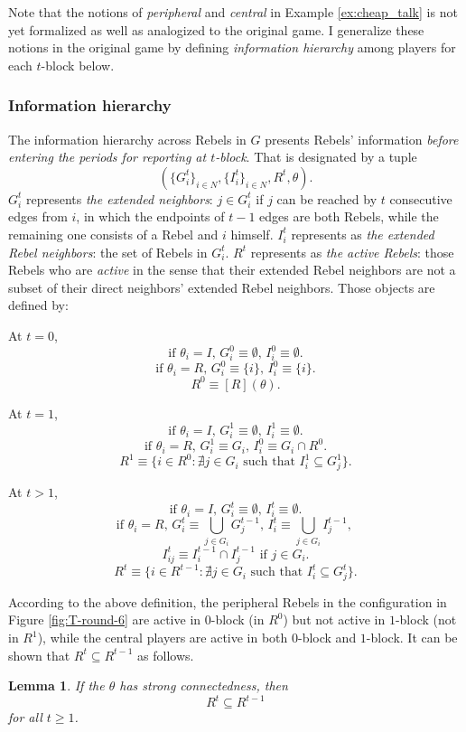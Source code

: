 \documentclass[12pt,letter]{article}
\newtheorem{lemma}{Lemma}[section]
\theoremstyle{definition}
\theoremstyle{remark}
\theoremstyle{claim}
\begin{document}
Note that the notions of \textit{peripheral} and \textit{central} in Example \ref{ex:cheap_talk} is not yet formalized as well as analogized to the original game. I generalize these notions in the original game by defining \textit{information hierarchy} among players for each $t$-block below.


\subsubsection{Information hierarchy}
\label{sec:info}
The information hierarchy across Rebels in $G$ presents Rebels' information \textit{before entering the periods for reporting at $t$-block}. That is designated by a tuple \[(\{G^{t}_i\}_{i\in N}, \{I^{t}_i\}_{i\in N}, R^t,\theta).\]
$G^{t}_i$ represents \textit{the extended neighbors}: $j\in G^{t}_i$ if $j$ can be reached by $t$ consecutive edges from $i$, in which the endpoints of $t-1$ edges are both Rebels, while the remaining one consists of a Rebel and $i$ himself. $I^{t}_i$ represents as \textit{the extended Rebel neighbors}: the set of Rebels in $G^t_i$. $R^t$ represents as \textit{the active Rebels}: those Rebels who are \textit{active} in the sense that their extended Rebel neighbors are not a subset of their direct neighbors' extended Rebel neighbors. Those objects are defined by:

At $t=0$,
\[\text{if $\theta_i=I$, $G^{0}_i\equiv \emptyset$, $I^{0}_i\equiv \emptyset$.}\] 
\[\text{if $\theta_i=R$, $G^{0}_i\equiv \{i\}$, $I^{0}_i\equiv \{i\}$.}\] 
\[\text{$R^0\equiv [R](\theta)$.}\] 

At $t=1$,
\[\text{if $\theta_i=I$, $G^{1}_i\equiv \emptyset$, $I^{1}_i\equiv \emptyset$.}\] 
\[\text{if $\theta_i=R$, $G^{1}_i\equiv G_i$, $I^{0}_i\equiv G_i\cap R^0$.}\] 
\[\text{$R^1\equiv \{i\in R^0: \nexists j\in G_i \text{ such that }I^1_i\subseteq G^1_j\}$.}\] 

At $t>1$, 
\[\text{if $\theta_i=I$, $G^{t}_i\equiv \emptyset$, $I^{t}_i\equiv \emptyset$.}\] 
\[\text{if $\theta_i=R$, $G^{t}_i\equiv \bigcup_{j\in G_i} G^{t-1}_j$, $I^{t}_i\equiv \bigcup_{j\in G_i} I^{t-1}_j$, }\] 
\[\text{$I^{t}_{ij}\equiv I^{t-1}_i\cap I^{t-1}_j$ if $j\in G_i$.}\]
\[\text{$R^t\equiv \{i\in R^{t-1}: \nexists j\in G_i \text{ such that }I^t_i\subseteq G^t_j\}$.}\]



According to the above definition, the peripheral Rebels in the configuration in Figure \ref{fig:T-round-6} are active in $0$-block (in $R^0$) but not active in $1$-block (not in $R^1$), while the central players are active in both $0$-block and $1$-block. It can be shown that $R^t\subseteq R^{t-1}$ as follows. 
\begin{lemma}
\label{lemma_inclusion}
If the $\theta$ has strong connectedness, then 
\[R^t\subseteq R^{t-1}\] for all $t\geq 1$.
\end{lemma}
\end{document}
